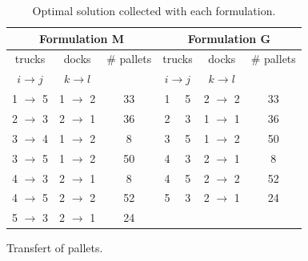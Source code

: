 \documentclass[preprint,12pt,authoryear]{elsarticle}
\begin{document}
\begin{table}[h]
    \begin{subtable}{0.90\linewidth}
        \centering
           \begin{tabular}{| c | c | c | c | c || c | c | c | c | c |}
           \hline
            \multicolumn{5}{|c||}{Formulation M}  & \multicolumn{5}{c|}{Formulation G} \\
            \hline
            \multicolumn{2}{|c|}{\quad trucks \quad }   & \multicolumn{2}{|c|}{\quad  docks \quad }   & \# pallets &  \multicolumn{2}{|c|}{\quad  trucks \quad }  & \multicolumn{2}{|c|}{\quad  docks \quad }   & \# pallets\\
            \cline{1-4}  \cline{6-9}
             \multicolumn{2}{|c|}{$i \rightarrow j$} &  \multicolumn{2}{|c|}{$k \rightarrow l$} &  &   \multicolumn{2}{|c|}{$i \rightarrow j$} &  \multicolumn{2}{|c|}{$k \rightarrow l$} & \\
           \hline
        \multicolumn{2}{|c|}{1 $\rightarrow$  5}   &  \multicolumn{2}{|c|}{1 $\rightarrow$  2}   &   33       &  1 &  5   &  \multicolumn{2}{|c|}{2 $\rightarrow$  2}   &   33 \\
         \multicolumn{2}{|c|}{2 $\rightarrow$  3}   &  \multicolumn{2}{|c|}{2 $\rightarrow$  1}   &   36       &  2 &  3   &  \multicolumn{2}{|c|}{1 $\rightarrow$  1}   &   36 \\
         \multicolumn{2}{|c|}{3 $\rightarrow$  4}   & \multicolumn{2}{|c|}{1 $\rightarrow$  2}   &    8         &  3 &  5   &  \multicolumn{2}{|c|}{1 $\rightarrow$  2}   &   50\\
         \multicolumn{2}{|c|}{3 $\rightarrow$  5}   &  \multicolumn{2}{|c|}{1 $\rightarrow$  2}   &   50       &  4 &  3   &  \multicolumn{2}{|c|}{2 $\rightarrow$  1}   &    8 \\
         \multicolumn{2}{|c|}{4 $\rightarrow$  3}   &  \multicolumn{2}{|c|}{2 $\rightarrow$  1}   &    8        &  4 &  5   &  \multicolumn{2}{|c|}{2 $\rightarrow$  2}   &   52\\
         \multicolumn{2}{|c|}{4 $\rightarrow$  5}   &  \multicolumn{2}{|c|}{2 $\rightarrow$  2}   &   52       &  5 &  3   & \multicolumn{2}{|c|}{ 2 $\rightarrow$  1}   &   24\\
         \multicolumn{2}{|c|}{5 $\rightarrow$  3}   &  \multicolumn{2}{|c|}{2 $\rightarrow$  1}   &   24       &  \multicolumn{2}{|c|}{ } & \multicolumn{2}{|c|}{ } & \\
            \hline
           \end{tabular}
           \caption{Transfert of pallets.}
           \label{tab:didacTransPallets}
    \end{subtable}

    \caption{Optimal solution collected with each formulation.}
    \label{tab:didacOptimalMG}
\end{table}           
\end{document}
